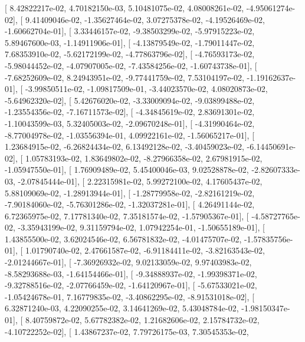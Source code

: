 \documentclass{article}
\begin{document}
       [  8.42822217e-02,   4.70182150e-03,   5.10481075e-02,
          4.08008261e-02,  -4.95061274e-02],
       [  9.41409046e-02,  -1.35627464e-02,   3.07275378e-02,
         -4.19526469e-02,  -1.60662704e-01],
       [  3.33446157e-02,  -9.38503299e-02,  -5.97915223e-02,
          5.89467600e-03,  -1.14911906e-01],
       [ -4.13879549e-02,  -1.79011447e-02,   7.68353910e-02,
         -5.62172199e-02,  -4.77863796e-02],
       [ -4.76593173e-02,  -5.98044452e-02,  -4.07907005e-02,
         -7.43584256e-02,  -1.60743738e-01],
       [ -7.68252609e-02,   8.24943951e-02,  -9.77441759e-02,
          7.53104197e-02,  -1.19162637e-01],
       [ -3.99850511e-02,  -1.09817509e-01,  -3.44023570e-02,
          4.08020873e-02,  -5.64962320e-02],
       [  5.42676020e-02,  -3.33009094e-02,  -9.03899488e-02,
         -1.23554356e-02,  -7.16711573e-02],
       [ -4.34845619e-02,   2.83691301e-02,  -1.10043599e-03,
          5.32405003e-02,  -2.09670248e-01],
       [ -4.31990464e-02,  -8.77004978e-02,  -1.03556394e-01,
          4.09922161e-02,  -1.56065217e-01],
       [  1.23684915e-02,  -6.26824434e-02,   6.13492128e-02,
         -3.40459023e-02,  -6.14450691e-02],
       [  1.05783193e-02,   1.83649802e-02,  -8.27966358e-02,
          2.67981915e-02,  -1.05947550e-01],
       [  1.76909489e-02,   5.45400046e-03,   9.02528878e-02,
         -2.82607333e-03,  -2.07845444e-01],
       [  2.22315981e-02,   5.99272100e-02,   4.17605437e-02,
          5.88109069e-02,  -1.28913944e-01],
       [ -1.28779958e-02,  -2.82161219e-02,  -7.90184060e-02,
         -5.76301286e-02,  -1.32037281e-01],
       [  4.26491144e-02,   6.72365975e-02,   7.17781340e-02,
          7.35181574e-02,  -1.57905367e-01],
       [ -4.58727765e-02,  -3.35943199e-02,   9.31159794e-02,
          1.07942254e-01,  -1.50655189e-01],
       [  1.43855500e-02,   3.62024546e-02,   6.56781832e-02,
         -4.01475707e-02,  -1.57835756e-01],
       [  1.01790740e-02,   2.47661587e-02,  -6.91184411e-02,
         -3.82163543e-02,  -2.01244667e-01],
       [ -7.36926932e-02,   9.02133059e-02,   9.97403983e-02,
         -8.58293688e-03,  -1.64154466e-01],
       [ -9.34888937e-02,  -1.99398371e-02,  -9.32788516e-02,
         -2.07766459e-02,  -1.64120967e-01],
       [ -5.67533021e-02,  -1.05424678e-01,   7.16779835e-02,
         -3.40862295e-02,  -8.91531018e-02],
       [  6.32871240e-03,   4.22090255e-02,   3.14641269e-02,
          5.43048784e-02,  -1.98150347e-01],
       [  8.40759872e-02,   5.67782382e-02,   1.21682606e-02,
          2.15784732e-02,  -4.10722252e-02],
       [  1.43867237e-02,   7.79726175e-03,   7.30545353e-02,
\end{document}
